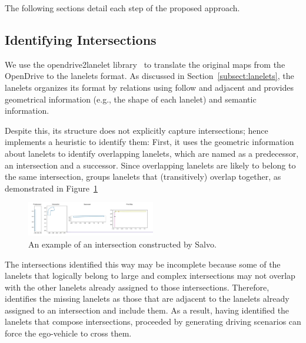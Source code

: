 \documentclass[conference]{IEEEtran}
\begin{document}
The following sections detail each step of the proposed approach.

\subsection{Identifying Intersections}
We use the opendrive2lanelet library~\cite{althoff2018automatic} to translate the original maps from the OpenDrive to the lanelets format. As discussed in Section~\ref{subsect:lanelets}, the lanelets organizes its format by relations using follow and adjacent and provides geometrical information (e.g., the shape of each lanelet) and semantic information. 

Despite this, its structure does not explicitly capture intersections; hence \tool implements a heuristic to identify them: First, it uses the geometric information about lanelets to identify overlapping lanelets, which are named as a predecessor, an intersection and a successor. Since overlapping lanelets are likely to belong to the same intersection, \tool groups lanelets that (transitively) overlap together, as demonstrated in Figure~\ref{fig:intersection_a}
%
\begin{figure}[H]
  \centering
    \includegraphics[width=0.5\textwidth]{images/intersection01}
  \caption{An example of an intersection constructed by Salvo.}
  \label{fig:intersection_a}
\end{figure}

The intersections identified this way may be incomplete because some of the lanelets that logically belong to large and complex intersections may not overlap with the other lanelets already assigned to those intersections. Therefore, \tool identifies the missing lanelets as those that are adjacent to the lanelets already assigned to an intersection and include them. As a result, having identified the lanelets that compose intersections, \tool proceeded by generating driving scenarios can force the ego-vehicle to cross them.
\end{document}
